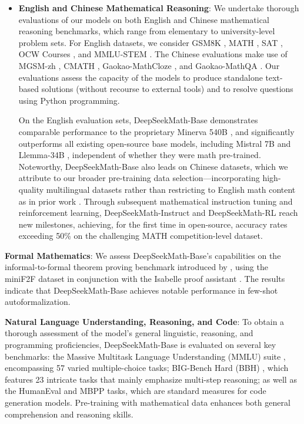 \begin{itemize}[topsep=0pt]
    \item \textbf{English and Chinese Mathematical Reasoning}: We undertake thorough evaluations of our models on both English and Chinese mathematical reasoning benchmarks, which range from elementary to university-level problem sets. For English datasets, we consider GSM8K \citep{gsm8k}, MATH \citep{MATH}, SAT \citep{llemma}, OCW Courses \citep{minerva}, and MMLU-STEM \citep{mmlu}. The Chinese evaluations make use of MGSM-zh \citep{mgsm}, CMATH \citep{wei2023cmath}, Gaokao-MathCloze \citep{agieval}, and Gaokao-MathQA \citep{agieval}. Our evaluations assess the capacity of the models to produce standalone text-based solutions (without recourse to external tools) and to resolve questions using Python programming.

    On the English evaluation sets, DeepSeekMath-Base demonstrates comparable performance to the proprietary Minerva 540B \citep{minerva}, and significantly outperforms all existing open-source base models, including Mistral 7B \citep{mistral} and Llemma-34B \citep{llemma}, independent of whether they were math pre-trained. Noteworthy, DeepSeekMath-Base also leads on Chinese datasets, which we attribute to our broader pre-training data selection—incorporating high-quality multilingual datasets rather than restricting to English math content as in prior work \citep{minerva,llemma}. Through subsequent mathematical instruction tuning and reinforcement learning, DeepSeekMath-Instruct and DeepSeekMath-RL reach new milestones, achieving, for the first time in open-source, accuracy rates exceeding 50\% on the challenging MATH competition-level dataset.
\end{itemize}

\item \textbf{Formal Mathematics}: We assess DeepSeekMath-Base's capabilities on the informal-to-formal theorem proving benchmark introduced by \citep{dsp_proof}, using the miniF2F dataset \citep{minif2f} in conjunction with the Isabelle proof assistant \citep{isabelle}. The results indicate that DeepSeekMath-Base achieves notable performance in few-shot autoformalization.

\item \textbf{Natural Language Understanding, Reasoning, and Code}: To obtain a thorough assessment of the model’s general linguistic, reasoning, and programming proficiencies, DeepSeekMath-Base is evaluated on several key benchmarks: the Massive Multitask Language Understanding (MMLU) suite \citep{mmlu}, encompassing 57 varied multiple-choice tasks; BIG-Bench Hard (BBH) \citep{bbh}, which features 23 intricate tasks that mainly emphasize multi-step reasoning; as well as the HumanEval \citep{codex} and MBPP \citep{mbpp} tasks, which are standard measures for code generation models. Pre-training with mathematical data enhances both general comprehension and reasoning skills.

